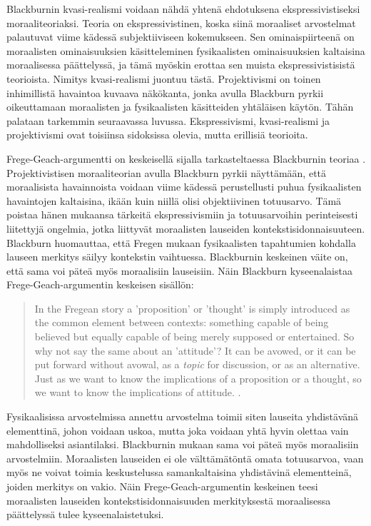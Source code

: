 \documentclass[a4paper,12pt,times,titlepage,finnish]{article}
\begin{document}
Blackburnin kvasi-\-realismi voidaan nähdä yhtenä ehdotuksena ekspressivistiseksi moraaliteoriaksi. Teoria on ekspressivistinen, koska siinä moraaliset arvostelmat palautuvat viime kädessä subjektiiviseen kokemukseen. Sen ominaispiirteenä on moraalisten ominaisuuksien kä\-sit\-te\-leminen fysikaalisten ominaisuuksien kaltaisina moraalisessa päättelyssä, ja tämä myöskin erottaa sen muista ekspressivistisistä teorioista. Nimitys kvasi-\-realismi juontuu tästä. Projektivismi on toinen inhimillistä havaintoa kuvaava näkökanta, jonka avulla Blackburn pyrkii oikeuttamaan moraalisten ja fysikaalisten käsitteiden yhtäläisen käytön. Tähän palataan tarkemmin seuraavassa luvussa. Ekspressivismi, kvasi-\-realismi ja projektivismi ovat toisiinsa sidoksissa olevia, mutta erillisiä teorioita.

Frege-Geach-argumentti on keskeisellä sijalla tarkasteltaessa Blackburnin teoriaa \citep[72]{Blackburn98}. Projektivistisen moraaliteorian avulla Blackburn pyrkii näyttämään, että moraalisista havainnoista voidaan viime kädessä perustellusti puhua fysikaalisten havaintojen kaltaisina, ikään kuin niillä olisi objektiivinen totuusarvo. Tä\-mä poistaa hänen mukaansa tärkeitä ekspressivismiin ja totuusarvoihin perinteisesti liitettyjä ongelmia, jotka liittyvät moraalisten lauseiden kontekstisidonnaisuuteen. Blackburn huomauttaa, että Fregen mukaan fysikaalisten tapahtumien kohdalla lauseen merkitys säilyy kontekstin vaihtuessa. Blackburnin keskeinen väite on, että sama voi päteä myös moraalisiin lauseisiin. Näin Blackburn kyseenalaistaa Frege-Geach-argumentin keskeisen sisällön:

\begin{quote}
	In the Fregean story a 'proposition' or 'thought' is simply introduced as the common element between contexts: something capable of being believed but equally capable of being merely supposed or entertained. So why not say the same about an 'attitude'? It can be avowed, or it can be put forward without avowal, as a {\it topic} for discussion, or as an alternative. Just as we want to know the implications of a proposition or a thought, so we want to know the implications of attitude. \citep[71]{Blackburn98}.
\end{quote}

Fysikaalisissa arvostelmissa annettu arvostelma toimii siten lauseita yhdistävänä elementtinä, johon voidaan uskoa, mutta joka voidaan yhtä hyvin olettaa vain mahdolliseksi asiantilaksi. Blackburnin mukaan sama voi päteä myös moraalisiin arvostelmiin. Moraalisten lauseiden ei ole välttämätöntä omata totuusarvoa, vaan myös ne voivat toimia keskustelussa samankaltaisina yhdistävinä elementteinä, joiden merkitys on vakio. Näin Frege-Geach-argumentin keskeinen teesi moraalisten lauseiden kontekstisidonnaisuuden merkityksestä moraalisessa päät\-te\-lys\-sä tulee kyseenalaistetuksi. 
\end{document}
